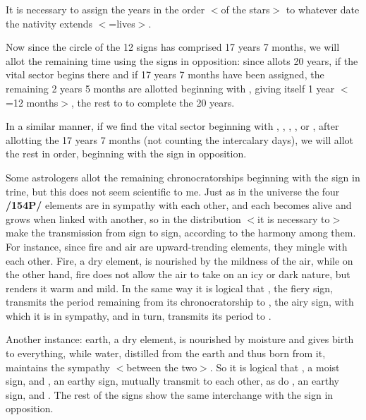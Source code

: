 It is necessary to assign the years in the order $<$of the stars$>$ to whatever date the nativity extends $<$=lives$>$.

Now since the circle of the 12 signs has comprised 17 years 7 months, we will allot the remaining time using the signs in opposition: since \Gemini\xspace allots 20 years, if the vital sector begins there and if 17 years 7 months have been assigned, the remaining 2 years 5 months are allotted beginning with \Sagittarius, giving \Sagittarius\xspace itself 1 year $<$=12 months$>$, the rest to \Capricorn\xspace to complete the 20 years.

In a similar manner, if we find the vital sector beginning with \Cancer, \Leo, \Virgo, \Capricorn, or \Aquarius, after allotting the 17 years 7 months (not counting the intercalary days), we will allot the rest in order, beginning with the sign in opposition.

Some astrologers allot the remaining chronocratorships beginning with the sign in trine, but this does not seem scientific to me. Just as in the universe the four \textbf{/154P/} elements are in sympathy with each other, and each becomes alive and grows when linked with another, so in the distribution $<$it is necessary to$>$ make the transmission from sign to sign, according to the harmony among them. For instance, since fire and air are upward-trending elements, they mingle with each other. Fire, a dry element, is nourished
by the mildness of the air, while on the other hand, fire does not allow the air to take on an icy or dark nature, but renders it warm and mild. In the same way it is logical that \Leo, the fiery sign, transmits the period remaining from its chronocratorship to \Aquarius, the airy sign, with which it is in sympathy, and in turn, \Aquarius\xspace transmits its period to \Leo.

Another instance: earth, a dry element, is nourished by moisture and gives birth to everything, while water, distilled from the earth and thus born from it, maintains the sympathy $<$between the two$>$. So it is logical that \Cancer, a moist sign, and \Capricorn, an earthy sign, mutually transmit to each other, as do \Virgo, an earthy sign, and \Pisces. The rest of the signs show the same interchange with the sign in opposition. 

